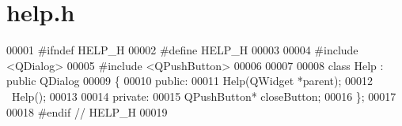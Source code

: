 \section{help.\-h}

\begin{DoxyCode}
00001 \textcolor{preprocessor}{#ifndef HELP\_H}
00002 \textcolor{preprocessor}{}\textcolor{preprocessor}{#define HELP\_H}
00003 \textcolor{preprocessor}{}
00004 \textcolor{preprocessor}{#include <QDialog>}
00005 \textcolor{preprocessor}{#include <QPushButton>}
00006 
00007 
00008 \textcolor{keyword}{class }Help : \textcolor{keyword}{public} QDialog
00009 \{
00010 \textcolor{keyword}{public}:
00011     Help(QWidget *parent);
00012     ~Help();
00013 
00014 \textcolor{keyword}{private}:
00015     QPushButton* closeButton;
00016 \};
00017 
00018 \textcolor{preprocessor}{#endif // HELP\_H}
00019 \textcolor{preprocessor}{}
\end{DoxyCode}
